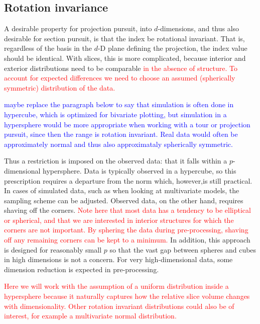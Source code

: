 \documentclass[]{interact}
\theoremstyle{plain}%
\theoremstyle{definition}
\theoremstyle{remark}
\begin{document}
\hypertarget{rotation-invariance}{%
\subsection{Rotation invariance}\label{rotation-invariance}}

A desirable property for projection pursuit, into \(d\)-dimensions, and
thus also desirable for section pursuit, is that the index be rotational
invariant. That is, regardless of the basis in the \(d\)-D plane
defining the projection, the index value should be identical. With
slices, this is more complicated, because interior and exterior
distributions need to be comparable
\textcolor{red}{in the absence of structure. To account for expected differences we need to choose an assumed (spherically symmetric) distribution of the data.}

\textcolor{blue}{maybe replace the paragraph below to say that simulation is often done in hypercube, which is optimized for bivariate plotting, but simulation in a hypersphere would be more appropriate when working with a tour or projection pursuit, since then the range is rotation invariant. Real data would often be approximately normal and thus also approximataly spherically symmetric.}

Thus a restriction is imposed on the observed data: that it falls within
a \(p\)-dimensional hypersphere. Data is typically observed in a
hypercube, so this prescription requires a departure from the norm
which, however,is still practical. In cases of simulated data, such as
when looking at multivariate models, the sampling scheme can be
adjusted. Observed data, on the other hand, requires shaving off the
corners.
\textcolor{red}{Note here that most data has a tendency to be elliptical or spherical, and that we are interested in interior structures for which the corners are not important. By sphering the data during pre-processing, shaving off any remaining corners can be kept to a minimum.}
In addition, this approach is designed for reasonably small \(p\) so
that the vast gap between spheres and cubes in high dimensions is not a
concern. For very high-dimensional data, some dimension reduction is
expected in pre-processing.

\textcolor{red}{Here we will work with the assumption of a uniform distribution inside a hypersphere because it naturally captures how the relative slice volume changes with dimensionality. Other rotation invariant distributions could also be of interest, for example a multivariate normal distribution.}
\end{document}
